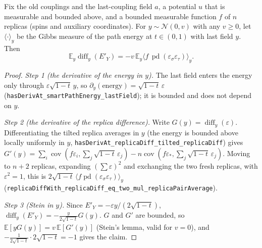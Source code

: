 \begin{theorem}\label{thm:sg-tal:perceptron-last-field-ibp}
  \leanok
Fix the old couplings and the last-coupling field $a$, a potential $u$ that is measurable and bounded above, and a bounded
measurable function $f$ of $n$ replicas (spins and auxiliary coordinates). For $y\sim\mathcal N(0,v)$ with any
$v\ge0$, let $\langle\cdot\rangle_y$ be the Gibbs measure of the path energy at $t\in(0,1)$ with last field $y$.
Then
\[
 \mathbb E_y\operatorname{diff}_y(E'_Y)=-v\,\mathbb E_y\bigl\langle f\,\operatorname{pd}(\varepsilon_\sigma\varepsilon_\tau)\bigr\rangle_y .
\]
\end{theorem}
\begin{proof}
  \leanok
\emph{Step 1 (the derivative of the energy in $y$).} The last field enters the energy only through $\varepsilon\sqrt{1-t}\,y$, so
$\partial_y(\text{energy})=\sqrt{1-t}\,\varepsilon$ (\texttt{hasDerivAt\_smartPathEnergy\_lastField}); it is bounded and does not
depend on $y$.

\emph{Step 2 (the derivative of the replica difference).} Write $G(y)=\operatorname{diff}_y(\varepsilon)$. Differentiating the
tilted replica averages in $y$ (the energy is bounded above locally uniformly in $y$, \texttt{hasDerivAt\_replicaDiff\_tilted\_replicaDiff})
gives $G'(y)=\sum_i\operatorname{cov}(f\varepsilon_i,\sum_j\sqrt{1-t}\,\varepsilon_j)-n\operatorname{cov}(f\varepsilon_*,\sum_j\sqrt{1-t}\,\varepsilon_j)$.
Moving to $n+2$ replicas, expanding $(\sum\varepsilon)^2$ and exchanging the two fresh replicas, with $\varepsilon^2=1$, this is
$2\sqrt{1-t}\,\langle f\operatorname{pd}(\varepsilon_\sigma\varepsilon_\tau)\rangle_y$
(\texttt{replicaDiffWith\_replicaDiff\_eq\_two\_mul\_replicaPairAverage}).

\emph{Step 3 (Stein in $y$).} Since $E'_Y=-\varepsilon y/(2\sqrt{1-t})$, $\operatorname{diff}_y(E'_Y)=-\frac{y}{2\sqrt{1-t}}G(y)$.
$G$ and $G'$ are bounded, so $\mathbb E[yG(y)]=v\,\mathbb E[G'(y)]$ (Stein's lemma, valid for $v=0$), and
$-\frac1{2\sqrt{1-t}}\cdot 2\sqrt{1-t}=-1$ gives the claim.
\end{proof}

